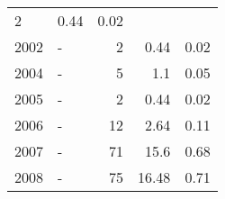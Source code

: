 \begin{longtable}{lXrrr}
       \num{2} &
       \num[round-mode=places,round-precision=2]{0.44} &
         \num[round-mode=places,round-precision=2]{0.02} \\

     2002 &
     \multicolumn{1}{X}{ -  } &


       \num{2} &
       \num[round-mode=places,round-precision=2]{0.44} &
         \num[round-mode=places,round-precision=2]{0.02} \\

     2004 &
     \multicolumn{1}{X}{ -  } &


       \num{5} &
       \num[round-mode=places,round-precision=2]{1.1} &
         \num[round-mode=places,round-precision=2]{0.05} \\

     2005 &
     \multicolumn{1}{X}{ -  } &


       \num{2} &
       \num[round-mode=places,round-precision=2]{0.44} &
         \num[round-mode=places,round-precision=2]{0.02} \\

     2006 &
     \multicolumn{1}{X}{ -  } &


       \num{12} &
       \num[round-mode=places,round-precision=2]{2.64} &
         \num[round-mode=places,round-precision=2]{0.11} \\

     2007 &
     \multicolumn{1}{X}{ -  } &


       \num{71} &
       \num[round-mode=places,round-precision=2]{15.6} &
         \num[round-mode=places,round-precision=2]{0.68} \\

     2008 &
     \multicolumn{1}{X}{ -  } &


       \num{75} &
       \num[round-mode=places,round-precision=2]{16.48} &
         \num[round-mode=places,round-precision=2]{0.71} \\


\end{longtable}
